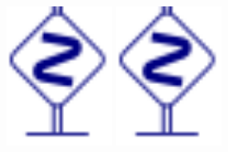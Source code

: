 \documentclass[t,10pt]{beamer}
\begin{document}
{
  \begin{frame}[c]
    \begin{center}
      \includegraphics[width=35mm]{dbend.pdf}\!\!%
      \includegraphics[width=35mm]{dbend.pdf}
    \end{center}
  \end{frame}
}
\end{document}
